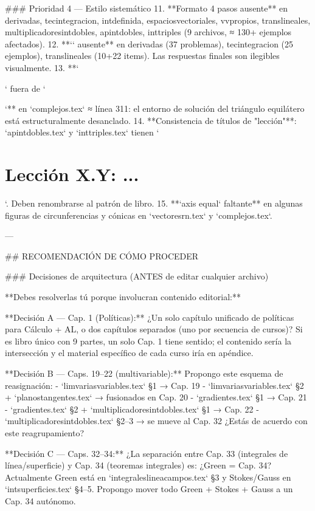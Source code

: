 \begin{myproof}
\begin{pasos}
\begin{example}
\begin{rem}
\begin{prob}
### Prioridad 4 — Estilo sistemático
11. **Formato 4 pasos ausente** en derivadas, tecintegracion, intdefinida, espaciosvectoriales, vvpropios, translineales, multiplicadoresintdobles, apintdobles, inttriples (9 archivos, ≈ 130+ ejemplos afectados).
12. **`\boxed{}` ausente** en derivadas (37 problemas), tecintegracion (25 ejemplos), translineales (10+22 items). Las respuestas finales son ilegibles visualmente.
13. **`\begin{myproof}` fuera de `\begin{prob}`** en `complejos.tex` ≈ línea 311: el entorno de solución del triángulo equilátero está estructuralmente desanclado.
14. **Consistencia de títulos de "lección"**: `apintdobles.tex` y `inttriples.tex` tienen `\chapter{Lección X.Y: ...}`. Deben renombrarse al patrón de libro.
15. **`axis equal` faltante** en algunas figuras de circunferencias y cónicas en `vectoresrn.tex` y `complejos.tex`.

---

## RECOMENDACIÓN DE CÓMO PROCEDER

### Decisiones de arquitectura (ANTES de editar cualquier archivo)

**Debes resolverlas tú porque involucran contenido editorial:**

**Decisión A — Cap. 1 (Políticas):** ¿Un solo capítulo unificado de políticas para Cálculo + AL, o dos capítulos separados (uno por secuencia de cursos)? Si es libro único con 9 partes, un solo Cap. 1 tiene sentido; el contenido sería la intersección y el material específico de cada curso iría en apéndice.

**Decisión B — Caps. 19–22 (multivariable):** Propongo este esquema de reasignación:
- `limvariasvariables.tex` §1 → Cap. 19  
- `limvariasvariables.tex` §2 + `planostangentes.tex` → fusionados en Cap. 20  
- `gradientes.tex` §1 → Cap. 21  
- `gradientes.tex` §2 + `multiplicadoresintdobles.tex` §1 → Cap. 22  
- `multiplicadoresintdobles.tex` §2–3 → se mueve al Cap. 32  
¿Estás de acuerdo con este reagrupamiento?

**Decisión C — Caps. 32–34:** ¿La separación entre Cap. 33 (integrales de línea/superficie) y Cap. 34 (teoremas integrales) es: ¿Green = Cap. 34? Actualmente Green está en `integraleslineacampos.tex` §3 y Stokes/Gauss en `intsuperficies.tex` §4–5. Propongo mover todo Green + Stokes + Gauss a un Cap. 34 autónomo.


\end{prob}
\end{myproof}
\end{prob}
\end{rem}
\end{example}
\end{pasos}
\end{myproof}
